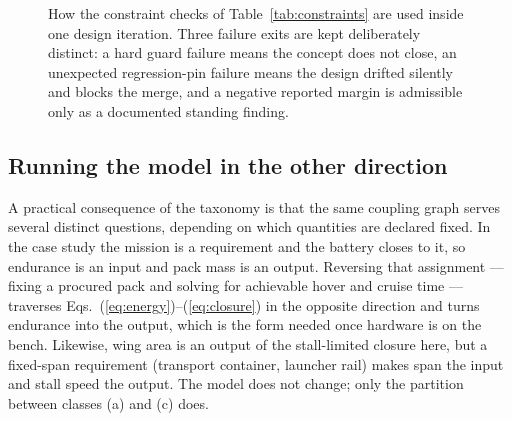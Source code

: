 \begin{figure}[htbp]
{%
}
\caption{How the constraint checks of Table~\ref{tab:constraints} are
used inside one design iteration. Three failure exits are kept
deliberately distinct: a hard guard failure means the concept does not
close, an unexpected regression-pin failure means the design drifted
silently and blocks the merge, and a negative reported margin is
admissible only as a documented standing finding.}
\label{fig:checkflow}
\end{figure}

\subsection{Running the model in the other direction}
\label{sec:duality}

A practical consequence of the taxonomy is that the same coupling graph
serves several distinct questions, depending on which quantities are
declared fixed. In the case study the mission is a requirement and the
battery closes to it, so endurance is an input and pack mass is an
output. Reversing that assignment --- fixing a procured pack and
solving for achievable hover and cruise time --- traverses
Eqs.~(\ref{eq:energy})--(\ref{eq:closure}) in the opposite direction
and turns endurance into the output, which is the form needed once
hardware is on the bench. Likewise, wing area is an output of the
stall-limited closure here, but a fixed-span requirement (transport
container, launcher rail) makes span the input and stall speed the
output. The model does not change; only the partition between classes
(a) and (c) does.

